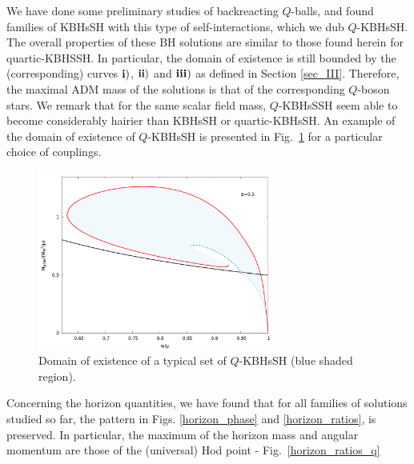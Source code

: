 We have done some preliminary studies of backreacting $Q$-balls, and found families of KBHsSH with this type of self-interactions, which we dub $Q$-KBHsSH. The overall properties of these BH solutions are similar to those found herein for  quartic-KBHSSH.
In particular, the domain of existence is still bounded by the (corresponding)
curves ${\bf i)}$, ${\bf ii)}$ and ${\bf iii)}$ as defined in Section \ref{sec_III}. 
Therefore, the maximal ADM mass 
of the solutions is 
that of the corresponding $Q$-boson stars.
We remark that for the same scalar field mass, $Q$-KBHsSSH seem able to become considerably hairier than KBHsSH or quartic-KBHsSH.
%
An example of the domain of existence of $Q$-KBHsSH is presented in Fig.~\ref{qkbhsh} for a particular choice of couplings.
%
\begin{figure}[h!]
  \begin{center}
     \includegraphics[width=0.7\textwidth]{papers/selfInteractions/w-vs-M-Q-a=05.png}
      \end{center}
  \caption{Domain of existence of a typical set of $Q$-KBHsSH (blue shaded region).}
  \label{qkbhsh}
\end{figure}
%


Concerning the horizon quantities, we have found
that for all families of solutions studied so far,
 the pattern in 
Figs. \ref{horizon_phase} and \ref{horizon_ratios},   
is preserved.
In particular, the maximum of the horizon mass and angular momentum
are those of the (universal) Hod point - Fig.~\ref{horizon_ratios_q}

